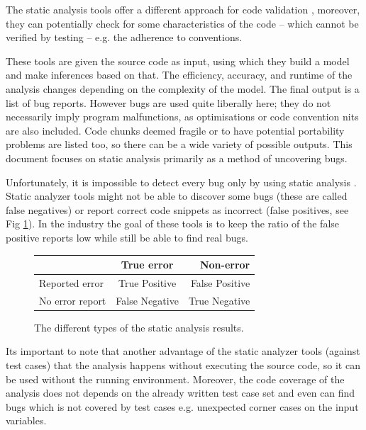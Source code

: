 \documentclass[oneside, a4paper, 12pt]{article}
\theoremstyle{definition}
\begin{document}
The static analysis tools offer a different approach for code validation 
\cite{Zhivich2009} \cite{Bessey2010}, moreover, they can potentially check for 
some characteristics of the code -- which cannot be verified by testing -- e.g. 
the adherence to conventions.

These tools are given the source code as input, using which they build a model 
and make inferences based on that. The efficiency, accuracy, and runtime of the 
analysis changes depending on the complexity of the model.
The final output is a list of bug reports. However bugs are used quite 
liberally here; they do not necessarily imply program malfunctions, as 
optimisations or code convention nits are also included. Code chunks deemed 
fragile or to have potential portability problems are listed too, so there can 
be a wide variety of possible outputs.
This document focuses on static analysis primarily as a method of uncovering 
bugs.
 
Unfortunately, it is impossible to detect every 
bug only by using static analysis \cite{Rice:53}. Static analyzer tools might 
not be able to discover some bugs (these are called false negatives) or report 
correct code snippets as incorrect (false positives, see Fig \ref{fig:bes}). In 
the industry the goal of these tools is to keep the ratio of the false positive 
reports low while still be able to find real bugs.

\begin{figure}[!h]
	\begin{center}
		\begin{tabular}{ | l | c | r | }
			\hline
			& True error   & Non-error \\ \hline
			Reported error   & True Positive  & False Positive   \\ \hline
			No error report & False Negative & True Negative    \\
			\hline
		\end{tabular}
	\end{center}
	\caption{The different types of the static analysis results.}
	\label{fig:bes}
\end{figure}

Its important to note that another advantage of the static analyzer tools 
(against test cases) that the analysis happens without executing the source 
code, so it can be used without the running environment. Moreover, the code 
coverage of the analysis does not depends on the already written test case set 
and even can find bugs which is not covered by test cases e.g. unexpected 
corner cases on the input variables. 
\end{document}
